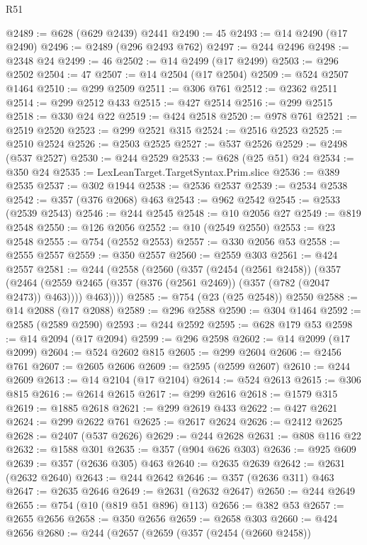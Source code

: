 \begin{lexlean}{R51}
\begin{coremodule}
@2489 := @628 (@629 @2439) @2441
@2490 := 45
@2493 := @14 @2490 (@17 @2490)
@2496 := @2489 (@296 @2493 @762)
@2497 := @244 @2496
@2498 := @2348 @24
@2499 := 46
@2502 := @14 @2499 (@17 @2499)
@2503 := @296 @2502
@2504 := 47
@2507 := @14 @2504 (@17 @2504)
@2509 := @524 @2507 @1464
@2510 := @299 @2509
@2511 := @306 @761
@2512 := @2362 @2511
@2514 := @299 @2512 @433
@2515 := @427 @2514
@2516 := @299 @2515
@2518 := @330 @24 @22
@2519 := @424 @2518
@2520 := @978 @761
@2521 := @2519 @2520
@2523 := @299 @2521 @315
@2524 := @2516 @2523
@2525 := @2510 @2524
@2526 := @2503 @2525
@2527 := @537 @2526
@2529 := @2498 (@537 @2527)
@2530 := @244 @2529
@2533 := @628 (@25 @51) @24
@2534 := @350 @24
@2535 := LexLeanTarget.TargetSyntax.Prim.slice
@2536 := @389 @2535
@2537 := @302 @1944
@2538 := @2536 @2537
@2539 := @2534 @2538
@2542 := @357 (@376 @2068) @463
@2543 := @962 @2542
@2545 := @2533 (@2539 @2543)
@2546 := @244 @2545
@2548 := @10 @2056 @27
@2549 := @819 @2548
@2550 := @126 @2056
@2552 := @10 (@2549 @2550)
@2553 := @23 @2548
@2555 := @754 (@2552 @2553)
@2557 := @330 @2056 @53
@2558 := @2555 @2557
@2559 := @350 @2557
@2560 := @2559 @303
@2561 := @424 @2557
@2581 := @244
    (@2558
      (@2560
        (@357
          (@2454 (@2561 @2458))
          (@357
            (@2464 (@2559 @2465 (@357 (@376 (@2561 @2469)) (@357 (@782 (@2047 @2473)) @463))))
            @463))))
@2585 := @754 (@23 (@25 @2548)) @2550
@2588 := @14 @2088 (@17 @2088)
@2589 := @296 @2588
@2590 := @304 @1464
@2592 := @2585 (@2589 @2590)
@2593 := @244 @2592
@2595 := @628 @179 @53
@2598 := @14 @2094 (@17 @2094)
@2599 := @296 @2598
@2602 := @14 @2099 (@17 @2099)
@2604 := @524 @2602 @815
@2605 := @299 @2604
@2606 := @2456 @761
@2607 := @2605 @2606
@2609 := @2595 (@2599 @2607)
@2610 := @244 @2609
@2613 := @14 @2104 (@17 @2104)
@2614 := @524 @2613
@2615 := @306 @815
@2616 := @2614 @2615
@2617 := @299 @2616
@2618 := @1579 @315
@2619 := @1885 @2618
@2621 := @299 @2619 @433
@2622 := @427 @2621
@2624 := @299 @2622 @761
@2625 := @2617 @2624
@2626 := @2412 @2625
@2628 := @2407 (@537 @2626)
@2629 := @244 @2628
@2631 := @808 @116 @22
@2632 := @1588 @301
@2635 := @357 (@904 @626 @303)
@2636 := @925 @609
@2639 := @357 (@2636 @305) @463
@2640 := @2635 @2639
@2642 := @2631 (@2632 @2640)
@2643 := @244 @2642
@2646 := @357 (@2636 @311) @463
@2647 := @2635 @2646
@2649 := @2631 (@2632 @2647)
@2650 := @244 @2649
@2655 := @754 (@10 (@819 @51 @896) @113)
@2656 := @382 @53
@2657 := @2655 @2656
@2658 := @350 @2656
@2659 := @2658 @303
@2660 := @424 @2656
@2680 := @244
    (@2657
      (@2659
        (@357
          (@2454 (@2660 @2458))

\end{coremodule}
\end{lexlean}
